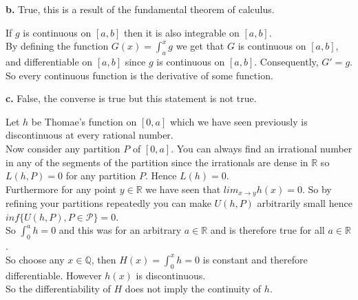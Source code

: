 \documentclass{article}
\begin{document}
{\Large\textbf{b.}} True, this is a result of the fundamental theorem of calculus.
\begin{center}
    \doublespacing
    If $g$ is continuous on $[a, b]$ then it is also integrable on $[a, b]$.
    \\By defining the function $G(x) =\int _a^x g$ we get that $G$ is continuous on $[a, b]$, and differentiable on $[a, b]$ since $g$ is continuous on $[a, b]$. Consequently, $G' = g$.
    \\So every continuous function is the derivative of some function.
\end{center}

{\Large\textbf{c.}} False, the converse is true but this statement is not true.
\begin{center}
    \doublespacing
    Let $h$ be Thomae's function on $[0, a]$ which we have seen previously is discontinuous at every rational number.
    \\Now consider any partition $P$ of $[0, a]$. You can always find an irrational number in any of the segments of the partition since the irrationals are dense in $\mathbb{R}$ so $L(h, P) = 0$ for any partition $P$. Hence $L(h) = 0$.
    \\Furthermore for any point $y\in\mathbb{R}$ we have seen that $lim_{x\rightarrow y} h(x) = 0$. So by refining your partitions repeatedly you can make $U(h, P)$ arbitrarily small hence $inf\{U(h, P), P\in\mathcal{P}\} = 0$.
    \\So $\int _0^a h = 0$ and this was for an arbitrary $a\in\mathbb{R}$ and is therefore true for all $a\in\mathbb{R}$.
    \\So choose any $x\in\mathbb{Q}$, then $H(x) =\int _0^x h = 0$ is constant and therefore differentiable. However $h(x)$ is discontinuous.
    \\So the differentiability of $H$ does not imply the continuity of $h$.
\end{center}
\end{document}
